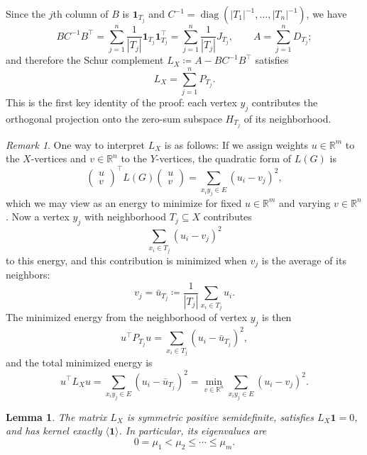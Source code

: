 \documentclass[twoside, reqno]{amsart}
\newtheorem{lemma}[theorem]{Lemma}
\theoremstyle{definition}
\theoremstyle{remark}
\newtheorem{remark}[theorem]{Remark}
\newcommand{\diag}{\operatorname{diag}}
\begin{document}
Since the $j$th column of $B$ is $\mathbf1_{T_j}$ and 
$C^{-1}=\diag(|T_1|^{-1},\dots,|T_n|^{-1})$, 
we have
\[
BC^{-1}B^\top=\sum_{j=1}^n\frac{1}{|T_j|}\mathbf1_{T_j}\mathbf1_{T_j}^\top
=\sum_{j=1}^n \frac{1}{|T_j|}J_{T_j},
\qquad
A=\sum_{j=1}^n D_{T_j};
\]
and therefore the Schur complement $L_X\coloneqq A-BC^{-1}B^\top$ satisfies
\begin{equation}\label{eq:L-sumP}
L_X
=\sum_{j=1}^n P_{T_j}.
\end{equation}
This is the first key identity of the proof: each vertex $y_j$ contributes 
the orthogonal projection onto the zero-sum subspace $H_{T_j}$ of its neighborhood.

\begin{remark}
One way to interpret $L_X$ is as follows: 
If we assign weights $u\in\mathbb R^m$ to the $X$-vertices 
and $v\in\mathbb R^n$ to the $Y$-vertices, the quadratic form of $L(G)$ is
\[
\begin{pmatrix}u\\v\end{pmatrix}^\top
L(G)\begin{pmatrix}u\\v\end{pmatrix}
=\sum_{x_iy_j\in E}(u_i-v_j)^2,
\]
which we may view as an energy to minimize for fixed $u\in\mathbb R^m$ 
and varying $v\in\mathbb R^n$. Now a vertex $y_j$ with neighborhood 
$T_j\subseteq X$ contributes
\[
\sum_{x_i\in T_j}(u_i-v_j)^2
\]
to this energy, and this contribution is minimized when $v_j$ is the 
average of its neighbors: 
\[
v_j=\bar u_{T_j}\coloneqq\frac{1}{|T_j|}\sum_{x_i\in T_j}u_i.
\]
The minimized energy from the neighborhood of vertex $y_j$ is then
\[
u^\top P_{T_j}u=\sum_{x_i\in T_j}(u_i-\bar u_{T_j})^2,
\]
and the total minimized energy is
\[
u^\top L_Xu
=\sum_{x_iy_j\in E}(u_i-\bar u_{T_j})^2
=\min_{v\in\mathbb R^n}\sum_{x_iy_j\in E}(u_i-v_j)^2.
\]
\end{remark}

\begin{lemma}\label{lem:kernel}
The matrix $L_X$ is symmetric positive semidefinite, satisfies 
$L_X\mathbf1=0$, and has kernel exactly $\langle \mathbf1\rangle$. 
In particular, its eigenvalues are
\[
0=\mu_1<\mu_2\le \cdots \le \mu_m.
\]
\end{lemma}
\end{document}
